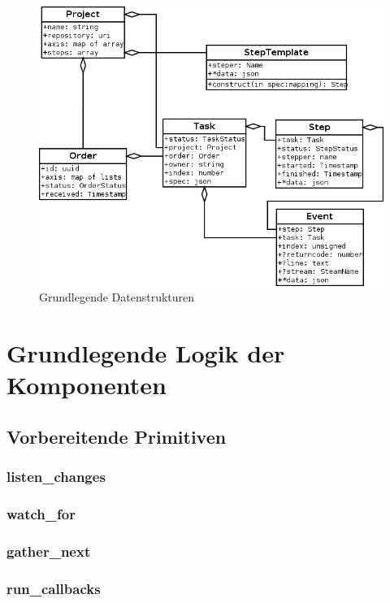 \begin{figure}[ht] 
  \centering
  \label{fig:datenstrukturen}
  \includegraphics[width=\textwidth]{imageinput/datenstrukturen-step-templates.png}
  \caption{Grundlegende Datenstrukturen}
\end{figure}




\section{Grundlegende Logik der Komponenten} %


\subsection{Vorbereitende Primitiven}

\subsubsection{listen\_changes}
\subsubsection{watch\_for}
\subsubsection{gather\_next}
\subsubsection{run\_callbacks}


